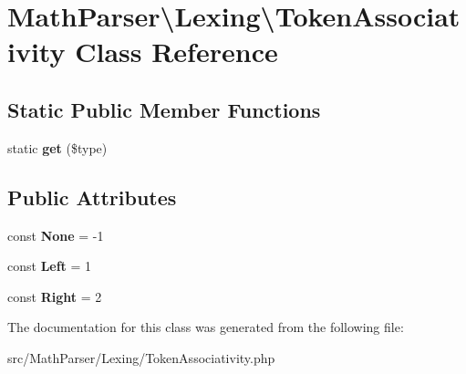 \hypertarget{classMathParser_1_1Lexing_1_1TokenAssociativity}{\section{Math\-Parser\textbackslash{}Lexing\textbackslash{}Token\-Associativity Class Reference}
\label{classMathParser_1_1Lexing_1_1TokenAssociativity}
}
\subsection*{Static Public Member Functions}
\begin{DoxyCompactItemize}
\item 
\hypertarget{classMathParser_1_1Lexing_1_1TokenAssociativity_a9b7bd3f830a05b42f4c3dab23e460259}{static {\bfseries get} (\$type)}\label{classMathParser_1_1Lexing_1_1TokenAssociativity_a9b7bd3f830a05b42f4c3dab23e460259}

\end{DoxyCompactItemize}
\subsection*{Public Attributes}
\begin{DoxyCompactItemize}
\item 
\hypertarget{classMathParser_1_1Lexing_1_1TokenAssociativity_adffe6855fddb6bda6d103ada98b3ce3e}{const {\bfseries None} = -\/1}\label{classMathParser_1_1Lexing_1_1TokenAssociativity_adffe6855fddb6bda6d103ada98b3ce3e}

\item 
\hypertarget{classMathParser_1_1Lexing_1_1TokenAssociativity_a6883e9d8f24bae72b130bf63bf8f9d5a}{const {\bfseries Left} = 1}\label{classMathParser_1_1Lexing_1_1TokenAssociativity_a6883e9d8f24bae72b130bf63bf8f9d5a}

\item 
\hypertarget{classMathParser_1_1Lexing_1_1TokenAssociativity_aee48fa332e48fcc040ce2383f7a0239c}{const {\bfseries Right} = 2}\label{classMathParser_1_1Lexing_1_1TokenAssociativity_aee48fa332e48fcc040ce2383f7a0239c}

\end{DoxyCompactItemize}


The documentation for this class was generated from the following file\-:\begin{DoxyCompactItemize}
\item 
src/\-Math\-Parser/\-Lexing/Token\-Associativity.\-php\end{DoxyCompactItemize}
